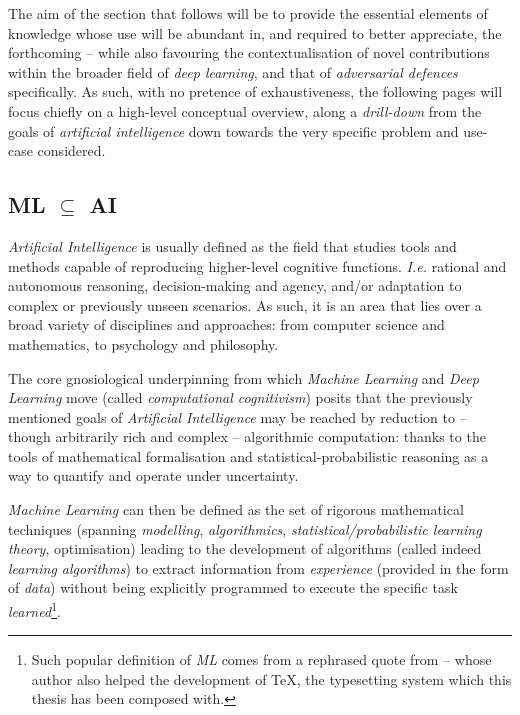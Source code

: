 

The aim of the section that follows will be to provide the essential elements of knowledge whose use will be abundant in, and required to better appreciate, the forthcoming -- while also favouring the contextualisation of novel contributions within the broader field of \textit{deep learning}, and that of \textit{adversarial defences} specifically. As such, with no pretence of exhaustiveness, the following pages will focus chiefly on a high-level conceptual overview, along a \textit{drill-down} from the goals of \textit{artificial intelligence} down towards the very specific problem and use-case considered.


\subsection{ML $\subseteq$ AI}

\textit{Artificial Intelligence} is usually defined as the field that studies tools and methods capable of reproducing higher-level cognitive functions. \textit{I.e.} rational and autonomous reasoning, decision-making and agency, and/or adaptation to complex or previously unseen scenarios. As such, it is an area that lies over a broad variety of disciplines and approaches: from computer science and mathematics, to psychology and philosophy.

The core gnosiological underpinning from which \textit{Machine Learning} and \textit{Deep Learning} move (called \textit{computational cognitivism}) posits that the previously mentioned goals of \textit{Artificial Intelligence} may be reached by reduction to -- though arbitrarily rich and complex -- algorithmic computation: thanks to the tools of mathematical formalisation and statistical-probabilistic reasoning as a way to quantify and operate under uncertainty.

\textit{Machine Learning} can then be defined as the set of rigorous mathematical techniques (spanning \textit{modelling}, \textit{algorithmics}, \textit{statistical/probabilistic learning theory}, optimisation) leading to the development of algorithms (called indeed \textit{learning algorithms}) to extract information from \textit{experience} (provided in the form of \textit{data}) without being explicitly programmed to execute the specific task \textit{learned}\footnote{Such popular definition of \textit{ML} comes from a rephrased quote from \cite{Samuel1959MachineLearning} -- whose author also helped the development of \TeX, the typesetting system which this thesis has been composed with.}.

